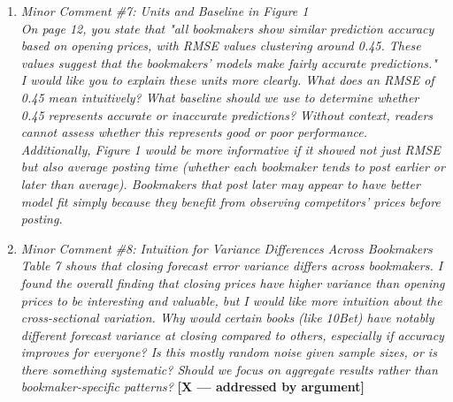 \documentclass[letterpaper,12pt]{article}
\newcounter{b}
\newcommand{\argX}{\textcolor{green!55!black}{\textbf{[X --- addressed by argument]}}}
\newcommand{\Reply}[1]{\par\noindent\textbf{Reply:} #1}
\begin{document}
\begin{enumerate}
\Reply{We agree that our discussion of balanced-book behavior (p.~6 and elsewhere) currently presents it as the dominant bookmaker strategy without sufficiently acknowledging the substantial evidence and practice of bookmakers taking directional positions when they believe their own prices are more accurate than the market, particularly among sharper, limit-taking books. We will revise the relevant passages to present balanced-book adjustment as one plausible mechanism generating the observed price movements, alongside proprietary risk-taking, and temper claims that assume balanced-book behavior as the default or universal bookmaker objective.}

\item \textit{Minor Comment \#7: Units and Baseline in Figure 1\\[6pt]
On page 12, you state that "all bookmakers show similar prediction accuracy based on opening prices, with RMSE values clustering around 0.45. These values suggest that the bookmakers' models make fairly accurate predictions."\\[6pt]
I would like you to explain these units more clearly. What does an RMSE of 0.45 mean intuitively? What baseline should we use to determine whether 0.45 represents accurate or inaccurate predictions? Without context, readers cannot assess whether this represents good or poor performance.\\[6pt]
Additionally, Figure 1 would be more informative if it showed not just RMSE but also average posting time (whether each bookmaker tends to post earlier or later than average). Bookmakers that post later may appear to have better model fit simply because they benefit from observing competitors' prices before posting.}

\item \textit{Minor Comment \#8: Intuition for Variance Differences Across Bookmakers\\[6pt]
Table 7 shows that closing forecast error variance differs across bookmakers. I found the overall finding that closing prices have higher variance than opening prices to be interesting and valuable, but I would like more intuition about the cross-sectional variation. Why would certain books (like 10Bet) have notably different forecast variance at closing compared to others, especially if accuracy improves for everyone? Is this mostly random noise given sample sizes, or is there something systematic? Should we focus on aggregate results rather than bookmaker-specific patterns?} \argX


\end{enumerate}
\end{document}
